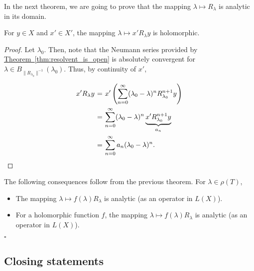 In the next theorem, we are going to prove that the mapping $\lambda \mapsto R_\lambda$ is analytic in its domain.

\begin{theorem}
    For $y\in X$ and $x' \in X'$, the mapping $\lambda \mapsto x'R_{\lambda}y$ is holomorphic.
\end{theorem}

\begin{proof}
    Let $\lambda_0$. Then, note that the Neumann series provided by \hyperref[thm:resolvent_is_open]{Theorem~\ref*{thm:resolvent_is_open}} is absolutely convergent for $\lambda \in B_{\|R_{\lambda_0}\|^{-1}}(\lambda_0)$. Thus, by continuity of $x'$,
    \[ \everymath{\displaystyle}
    \arraycolsep=1.8pt\def\arraystretch{2.5}
    \begin{array}{rcl}
        x'R_{\lambda}y & = & x'\left( \sum_{n = 0}^{\infty} (\lambda_0-\lambda)^n R_{\lambda_0}^{n+1} y \right)\\
        & = & \sum_{n = 0}^{\infty} (\lambda_0-\lambda)^{n} \underbrace{x' R_{\lambda_0}^{n+1}y}_{a_n}\\
        & = & \sum_{n = 0}^{\infty} a_n (\lambda_0-\lambda)^{n}.
    \end{array} \]
\end{proof}

\begin{corollary} The following consequences follow from the previous theorem. For $\lambda \in \rho(T)$,
    \begin{itemize}
        \item  The mapping $\lambda \mapsto f(\lambda)R_{\lambda}$ is analytic (as an operator in $L(X)$).
        \item  For a holomorphic function $f$, the mapping $\lambda \mapsto f(\lambda)R_{\lambda}$ is analytic (as an operator in $L(X)$).
    \end{itemize}
    \hfill $\square$
\end{corollary}

\subsection*{Closing statements}

